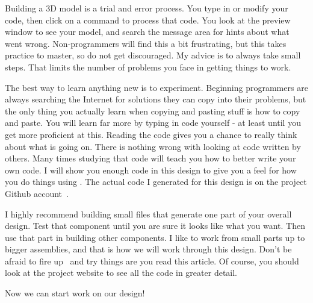 Building a 3D model is a trial and error process. You type in or modify your
code, then click on a command to process that code. You look at the preview
window to see your model, and search the message area for hints about what went
wrong.  Non-programmers will find this a bit frustrating, but this takes
practice to master, so do not get discouraged. My advice is to always take
small steps.  That limits the number of problems you face in getting things to
work.

The best way to learn anything new is to experiment. Beginning programmers are
always searching the Internet for solutions they can copy into their problems,
but the only thing you actually learn when copying and pasting stuff is how to
copy and paste. You will learn far more by typing in code yourself - at least
until you get more proficient at this. Reading the code gives you a chance to
really think about what is going on. There is nothing wrong with looking at
code written by others. Many times studying that code will teach you how to
better write your own code. I will show you enough code in this design to give
you a feel for how you do things using \osc. The actual code I generated for
this design is on the project Github account~\cite{blackr}.

I highly recommend building small files that generate one part of your overall
design. Test that component until you are sure it looks like what you want.
Then use that part in building other components. I like to work from small
parts up to bigger assemblies, and that is how we will work through this
design. Don't be afraid to fire up \osc\ and try things are you read this
article. Of course, you should look at the project website to see all the code
in greater detail.

Now we can start work on our design!

